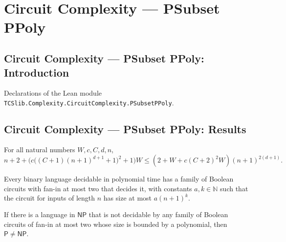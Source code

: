 \section{Circuit Complexity --- PSubset PPoly}
\subsection*{Circuit Complexity --- PSubset PPoly: Introduction}

Declarations of the Lean module \texttt{TCSlib.Complexity.CircuitComplexity.PSubsetPPoly}.

\subsection*{Circuit Complexity --- PSubset PPoly: Results}

\begin{theorem}
\label{Complexity.tableau_size_le}
\leanok
{}
For all natural numbers $W,c,C,d,n$,
$$n+2+\bigl(c\bigl((C+1)(n+1)^{d+1}+1\bigr)^2+1\bigr)W\leq
(2+W+c(C+2)^2W)(n+1)^{2(d+1)}.$$
\end{theorem}

\begin{theorem}
\label{Complexity.P_subset_PPoly}
\leanok
{}
Every binary language decidable in polynomial time has a family of Boolean circuits with
fan-in at most two that decides it, with constants $a,k \in \mathbb{N}$ such that the
circuit for inputs of length $n$ has size at most $a(n+1)^k$.
\end{theorem}

\begin{theorem}
\label{Complexity.P_ne_NP_of_not_NP_subset_PPoly}
\leanok
{}
If there is a language in $\mathsf{NP}$ that is not decidable by any family of Boolean
circuits of fan-in at most two whose size is bounded by a polynomial, then $\mathsf{P}
\ne \mathsf{NP}$.
\end{theorem}

